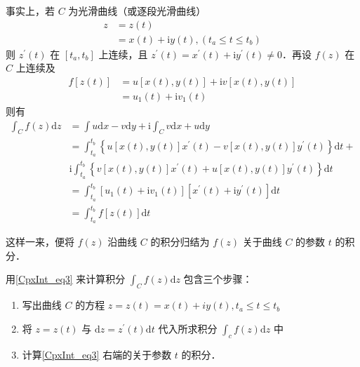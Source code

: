事实上，若 $C$ 为光滑曲线（或逐段光滑曲线）
\begin{equation}
\begin{aligned} z &=z(t) \\ &=x(t)+\mathrm{i} y(t),(t_a \leqslant t \leqslant t_b) \end{aligned}
\end{equation}
则 $z^\prime(t)$ 在 $[t_a, t_b]$ 上连续，且 $z^\prime(t) = x^\prime(t) + \mathrm iy^\prime(t) \neq  0$．再设 $ f (z)$ 在 $C$ 上连续及
\begin{equation}
\begin{aligned} f[z(t)] &=u[x(t), y(t)]+\mathrm{i} v[x(t), y(t)] \\ &=u_{1}(t)+\mathrm{i} v_{1}(t) \end{aligned}
\end{equation}
则有
\begin{equation} \label{CpxInt_eq3}
\begin{aligned} \int_{C} f(z) \mathrm{d} z &=\int u \mathrm{d} x-v \mathrm{d} y+\mathrm{i} \int_{C} v \mathrm{d} x+u \mathrm{d} y \\ &=\int_{t_a}^{t_b}\left\{u[x(t), y(t)] x^{\prime}(t)-v[x(t), y(t)] y^{\prime}(t)\right\} \mathrm{d} t+\\ & \mathrm{i} \int_{t_a}^{t_b}\left\{v[x(t), y(t)] x^{\prime}(t)+u[x(t), y(t)] y^{\prime}(t)\right\} \mathrm{d} t \\ &=\int_{t_a}^{t_b}\left[u_{1}(t)+\mathrm{i} v_{1}(t)\right]\left[x^{\prime}(t)+\mathrm{i} y^{\prime}(t)\right] \mathrm{d} t \\ &=\int_{t_a}^{t_b} f[z(t)] \mathrm{d} t \end{aligned}
\end{equation}

这样一来，便将 $ f (z)$ 沿曲线 $C$ 的积分归结为 $ f (z)$ 关于曲线 $C$ 的参数 $t$ 的积分．

用\autoref{CpxInt_eq3} 来计算积分 $\displaystyle \int_{C} f(z) \mathrm{d} z$ 包含三个步骤：
\begin{enumerate}
\item 写出曲线 $C$ 的方程 $z=z(t)=x(t)+i y(t), t_a \leqslant t \leqslant t_b$
\item 将 $ z = z(t)$ 与 $\mathrm{d}z = z^\prime (t)\mathrm{d}t $ 代入所求积分 $\displaystyle \int_{c} f(z) \mathrm{d} z$ 中
\item 计算\autoref{CpxInt_eq3} 右端的关于参数 $t$ 的积分．
\end{enumerate}

